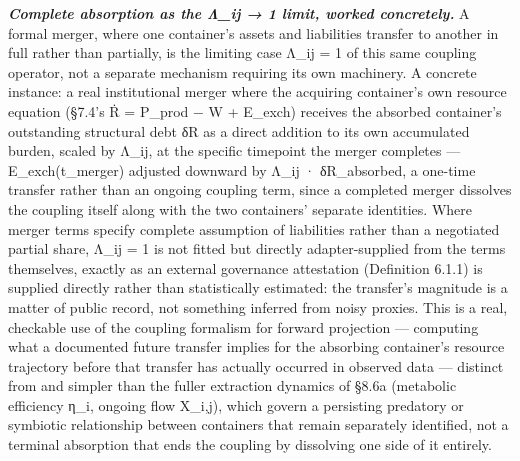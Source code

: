 \documentclass[
]{article}
\begin{document}
\emph{\textbf{Complete absorption as the Λ\_ij → 1 limit, worked
concretely.}} A formal merger, where one container's assets and
liabilities transfer to another in full rather than partially, is the
limiting case Λ\_ij = 1 of this same coupling operator, not a separate
mechanism requiring its own machinery. A concrete instance: a real
institutional merger where the acquiring container's own resource
equation (§7.4's Ṙ = P\_prod − W + E\_exch) receives the absorbed
container's outstanding structural debt δR as a direct addition to its
own accumulated burden, scaled by Λ\_ij, at the specific timepoint the
merger completes --- E\_exch(t\_merger) adjusted downward by Λ\_ij ·
δR\_absorbed, a one-time transfer rather than an ongoing coupling term,
since a completed merger dissolves the coupling itself along with the
two containers' separate identities. Where merger terms specify complete
assumption of liabilities rather than a negotiated partial share, Λ\_ij
= 1 is not fitted but directly adapter-supplied from the terms
themselves, exactly as an external governance attestation (Definition
6.1.1) is supplied directly rather than statistically estimated: the
transfer's magnitude is a matter of public record, not something
inferred from noisy proxies. This is a real, checkable use of the
coupling formalism for forward projection --- computing what a
documented future transfer implies for the absorbing container's
resource trajectory before that transfer has actually occurred in
observed data --- distinct from and simpler than the fuller extraction
dynamics of §8.6a (metabolic efficiency η\_i, ongoing flow X\_i,j),
which govern a persisting predatory or symbiotic relationship between
containers that remain separately identified, not a terminal absorption
that ends the coupling by dissolving one side of it entirely.
\end{document}
